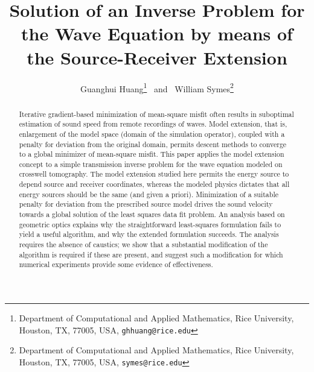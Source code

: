 \title{Solution of an Inverse Problem for the Wave Equation by means of the Source-Receiver Extension}


\author{
Guanghui Huang\thanks{Department of Computational and Applied Mathematics, Rice University,
Houston, TX, 77005, USA,
{\tt ghhuang@rice.edu}} \ and \ William Symes\thanks{Department of Computational and Applied Mathematics, Rice University,
Houston, TX, 77005, USA,
{\tt symes@rice.edu}}
}



\maketitle
\parskip 12pt

\begin{abstract}
  Iterative gradient-based minimization of mean-square misfit often
  results in suboptimal estimation of sound speed from remote
  recordings of waves. Model extension, that
  is, enlargement of the model space (domain of the simulation
  operator), coupled with a penalty for deviation from the original
  domain, permits descent methods to converge to a global minimizer of
  mean-square misfit. This paper applies the model extension concept
  to a simple transmission inverse problem for the wave equation modeled on crosswell
  tomography. The model extension studied here permits the energy
  source to depend source and receiver coordinates, whereas the
  modeled physics dictates that all energy sources should be the same
  (and given a priori). Minimization of a suitable penalty for
  deviation from the prescribed source model drives the sound velocity
  towards a global solution of the least squares data fit problem. An
  analysis based on geometric optics explains why the straightforward
  least-squares formulation fails to yield a useful algorithm, and why the
  extended formulation succeeds. The analysis requires the absence of
  caustics; we show that a substantial modification of the algorithm
  is required if these are present, and suggest such a modification
  for which numerical experiments provide some evidence of
  effectiveness.
\end{abstract}

